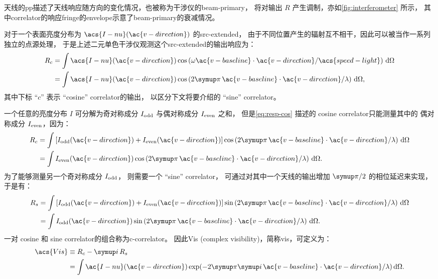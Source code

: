 天线的\ac{pp}描述了天线响应随方向的变化情况，也被称为干涉仪的\acf{beam-primary}，
将对输出 $R$ 产生调制，亦如\autoref{fig:interferometer} 所示，
其中\ac{correlator}的响应\ac{fringe}的\ac{envelope}示意了\ac{beam-primary}的衰减情况。

对于一个表面亮度分布为 $\acs{I-nu}(\ac{v-direction})$ 的\ac{src-extended}，
由于不同位置产生的辐射互不相干，因此可以被当作一系列独立的点源处理，
于是上述二元单色干涉仪观测这个\ac{src-extended}的输出响应为：
\begin{align}
  R_c & = \int \acs{I-nu}(\ac{v-direction})
      \cos \left( \omega \ac{v-baseline} \cdot \ac{v-direction} /
        \acs{speed-light} \right)
      \,\D{\Omega}  \\
    & = \int \acs{I-nu}(\ac{v-direction}) \cos \left(
        2\Cpi\, \ac{v-baseline} \cdot \ac{v-direction} / \lambda \right)
      \,\D{\Omega} ,
    \label{eq:resp-cos}
\end{align}
其中下标 \enquote{$c$} 表示 \enquote{cosine} \ac{correlator}的输出，
以区分下文将要介绍的 \enquote{sine} \ac{correlator}。

一个任意的亮度分布 $I$ 可分解为奇对称成分 $I_{\mathrm{odd}}$
与偶对称成分 $I_{\mathrm{even}}$ 之和，
但是\autoref{eq:resp-cos} 描述的 cosine \ac{correlator}只能测量其中的
偶对称成分 $I_{\mathrm{even}}$，因为：
\begin{align}
  R_c & = \int \left[ I_{\R{odd}}(\ac{v-direction}) +
        I_{\R{even}}(\ac{v-direction}) \right]
      \cos \left( 2\Cpi\, \ac{v-baseline} \cdot \ac{v-direction} /
        \lambda \right)
      \,\D{\Omega}  \\
    & = \int I_{\R{even}}(\ac{v-direction}) \cos \left(
        2\Cpi\, \ac{v-baseline} \cdot \ac{v-direction} / \lambda \right)
      \,\D{\Omega} .
\end{align}
为了能够测量另一个奇对称成分 $I_{\mathrm{odd}}$，
则需要一个 \enquote{sine} \ac{correlator}，
可通过对其中一个天线的输出增加 $\Cpi/2$ 的相位延迟来实现，于是有：
\begin{align}
  R_s & = \int \left[ I_{\R{odd}}(\ac{v-direction}) +
        I_{\R{even}}(\ac{v-direction}) \right]
      \sin \left( 2\Cpi\, \ac{v-baseline} \cdot \ac{v-direction} /
        \lambda \right)
      \,\D{\Omega}  \\
    & = \int I_{\R{odd}}(\ac{v-direction}) \sin \left(
        2\Cpi\, \ac{v-baseline} \cdot \ac{v-direction} / \lambda \right)
      \,\D{\Omega} .
\end{align}
一对 cosine 和 sine \ac{correlator}的组合称为\ac{c-correlator}。
因此\acl{Vis} (complex visibility)，简称\ac{vis}，可定义为：
\begin{align}
  \acs{Vis}
    & \equiv R_c - \Ci\, R_s  \\
    & = \int \ac{I-nu}(\ac{v-direction}) \exp
      (-2\Cpi\Ci\, \ac{v-baseline} \cdot \ac{v-direction} / \lambda)
      \,\D{\Omega} .
    \label{eq:vis}
\end{align}


